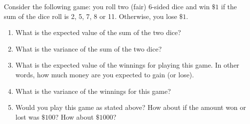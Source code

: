 Consider the following game: you roll two (fair) 6-sided dice and win $\$1$ if the sum of the dice roll is 2, 5, 7, 8 or 11. Otherwise, you lose $\$1$.

\begin{enumerate}[label=(\alph*)]
    \item What is the expected value of the sum of the two dice?
    \item What is the variance of the sum of the two dice?
    \item What is the expected value of the winnings for playing this game. In other words, how much money are you expected to gain (or lose).
    \item What is the variance of the winnings for this game?
    \item Would you play this game as stated above? How about if the amount won or lost was $\$100$? How about $\$1000$?
\end{enumerate}

\smallspace



